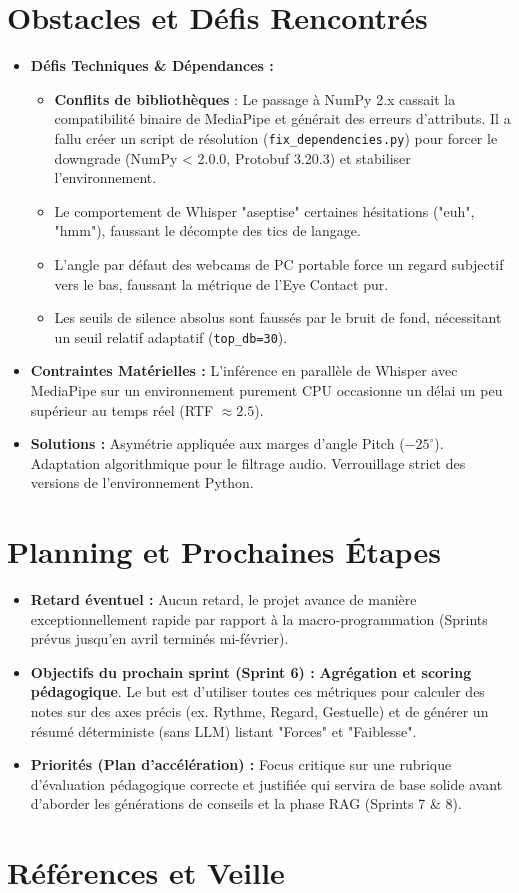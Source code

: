 \documentclass[12pt,a4paper]{article}
\begin{document}
\section{Obstacles et Défis Rencontrés}
\begin{itemize}
    \item \textbf{Défis Techniques \& Dépendances :}
    \begin{itemize}
        \item \textbf{Conflits de bibliothèques} : Le passage à NumPy 2.x cassait la compatibilité binaire de MediaPipe et générait des erreurs d'attributs. Il a fallu créer un script de résolution (\texttt{fix\_dependencies.py}) pour forcer le downgrade (NumPy < 2.0.0, Protobuf 3.20.3) et stabiliser l'environnement.
        \item Le comportement de Whisper "aseptise" certaines hésitations ("euh", "hmm"), faussant le décompte des tics de langage.
        \item L'angle par défaut des webcams de PC portable force un regard subjectif vers le bas, faussant la métrique de l'Eye Contact pur.
        \item Les seuils de silence absolus sont faussés par le bruit de fond, nécessitant un seuil relatif adaptatif (\texttt{top\_db=30}).
    \end{itemize}
    \item \textbf{Contraintes Matérielles :} L'inférence en parallèle de Whisper avec MediaPipe sur un environnement purement CPU occasionne un délai un peu supérieur au temps réel (RTF $\approx 2.5$).
    \item \textbf{Solutions :} Asymétrie appliquée aux marges d'angle Pitch ($-25^\circ$). Adaptation algorithmique pour le filtrage audio. Verrouillage strict des versions de l'environnement Python.
\end{itemize}

\section{Planning et Prochaines Étapes}
\begin{itemize}
    \item \textbf{Retard éventuel :} Aucun retard, le projet avance de manière exceptionnellement rapide par rapport à la macro-programmation (Sprints prévus jusqu'en avril terminés mi-février).
    \item \textbf{Objectifs du prochain sprint (Sprint 6) :} \textbf{Agrégation et scoring pédagogique}. Le but est d'utiliser toutes ces métriques pour calculer des notes sur des axes précis (ex. Rythme, Regard, Gestuelle) et de générer un résumé déterministe (sans LLM) listant "Forces" et "Faiblesse".
    \item \textbf{Priorités (Plan d'accélération) :} Focus critique sur une rubrique d'évaluation pédagogique correcte et justifiée qui servira de base solide avant d'aborder les générations de conseils et la phase RAG (Sprints 7 \& 8).
\end{itemize}

\section{Références et Veille}
\nocite{*}


\end{document}
